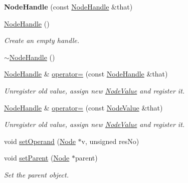 \begin{DoxyCompactItemize}
{\bfseries Node\+Handle} (const \hyperlink{structglow_1_1_node_handle}{Node\+Handle} \&that)
\item 
\mbox{\label{structglow_1_1_node_handle_a4401e5a207fea885cdbb88badf5fc518}} 
\hyperlink{structglow_1_1_node_handle_a4401e5a207fea885cdbb88badf5fc518}{Node\+Handle} ()
\begin{DoxyCompactList}\small\item\em Create an empty handle. \end{DoxyCompactList}\item 
\hyperlink{structglow_1_1_node_handle_a5d05908394a4401a5de3a244d55b843f}{$\sim$\+Node\+Handle} ()
\item 
\mbox{\label{structglow_1_1_node_handle_a6cf57e8bbd0c662f4f6ad5f8d9c79f80}} 
\hyperlink{structglow_1_1_node_handle}{Node\+Handle} \& \hyperlink{structglow_1_1_node_handle_a6cf57e8bbd0c662f4f6ad5f8d9c79f80}{operator=} (const \hyperlink{structglow_1_1_node_handle}{Node\+Handle} \&that)
\begin{DoxyCompactList}\small\item\em Unregister old value, assign new \hyperlink{structglow_1_1_node_value}{Node\+Value} and register it. \end{DoxyCompactList}\item 
\mbox{\label{structglow_1_1_node_handle_aff514c45c01ad0159f77c4ac195f963f}} 
\hyperlink{structglow_1_1_node_handle}{Node\+Handle} \& \hyperlink{structglow_1_1_node_handle_aff514c45c01ad0159f77c4ac195f963f}{operator=} (const \hyperlink{structglow_1_1_node_value}{Node\+Value} \&that)
\begin{DoxyCompactList}\small\item\em Unregister old value, assign new \hyperlink{structglow_1_1_node_value}{Node\+Value} and register it. \end{DoxyCompactList}\item 
void \hyperlink{structglow_1_1_node_handle_a7747b243b3fab345ee117cf5d0e8d9bb}{set\+Operand} (\hyperlink{classglow_1_1_node}{Node} $\ast$v, unsigned res\+No)
\item 
\mbox{\label{structglow_1_1_node_handle_aaee87960be8540791957b2a9b764b31f}} 
void \hyperlink{structglow_1_1_node_handle_aaee87960be8540791957b2a9b764b31f}{set\+Parent} (\hyperlink{classglow_1_1_node}{Node} $\ast$parent)
\begin{DoxyCompactList}\small\item\em Set the parent object. \end{DoxyCompactList}\end{DoxyCompactItemize}
